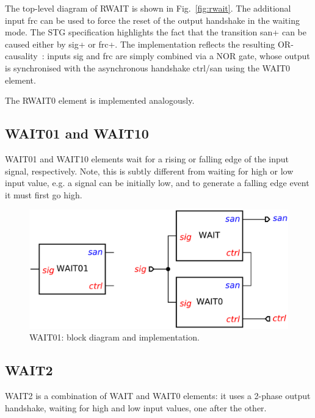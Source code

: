 \documentclass[conference]{IEEEtran}
\begin{document}
The top-level diagram of \textsf{RWAIT} is shown in Fig.~\ref{fig:rwait}. The additional input
\textsf{frc} can be used to force the reset of the output handshake in the waiting mode. The
STG specification highlights the fact that the transition \textsf{san+} can be caused either by
\textsf{sig+} or \textsf{frc+}. The implementation reflects the resulting
OR-causality~\cite{1996_yakovlev_or}: inputs \textsf{sig} and \textsf{frc} are simply combined
via a NOR gate, whose output is synchronised with the asynchronous handshake \textsf{ctrl/san}
using the \textsf{WAIT0} element.

The \textsf{RWAIT0} element is implemented analogously.

\subsection{\textsf{WAIT01} and \textsf{WAIT10}}

\textsf{WAIT01} and \textsf{WAIT10} elements wait for a rising or falling edge of the input
signal, respectively. Note, this is subtly different from waiting for high or low input value,
e.g. a signal can be initially low, and to generate a falling edge event it must first go high.

\begin{figure}
\begin{center}
    \includegraphics[scale=0.23]{fig/WAIT01.pdf}
    \caption{\textsf{WAIT01}: block diagram and implementation.}
    \label{fig:wait01}
\end{center}
\end{figure}

\subsection{\textsf{WAIT2}}
\textsf{WAIT2} is a combination of \textsf{WAIT} and \textsf{WAIT0} elements:
it uses a 2-phase output handshake, waiting for high and low input values, one after
the other.
\end{document}
